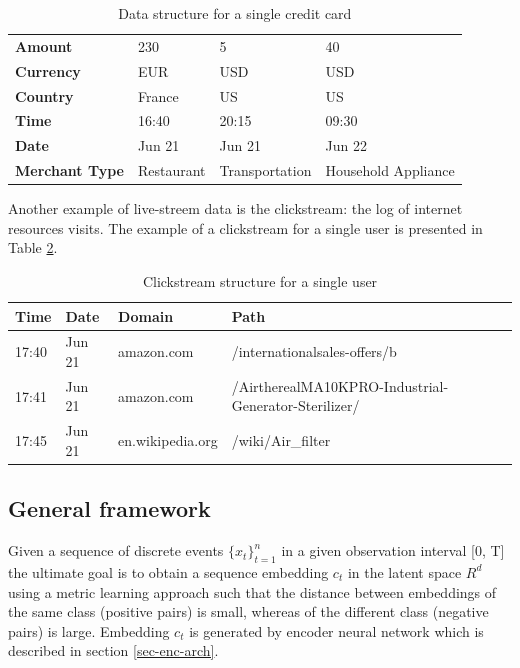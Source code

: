 \documentclass[sigconf]{acmart}
\begin{document}
\begin{table}[ht]
\caption{Data structure for a single credit card}
\begin{tabular}{ | m{7em} |  m{5em} m{5em} m{5em}| }
\hline
\textbf{Amount} & 230 & 5 & 40 \\
\textbf{Currency} & EUR & USD & USD \\
\textbf{Country} & France & US & US \\
\textbf{Time} & 16:40 & 20:15 & 09:30 \\
\textbf{Date} & Jun 21 & Jun 21 & Jun 22 \\
\textbf{Merchant Type} & Restaurant & Transport\-ation & Household Appliance \\
\hline
\end{tabular}
\label{tab-tr-data}
\end{table}

Another example of live-streem data is the clickstream: the log of internet resources visits. The example of a clickstream for a single user is presented in Table \ref{tab-cs-data}.

\begin{table}[ht]
\caption{Clickstream structure for a single user}
\begin{tabular}{ | m{2em} m{3em} m{6em} m{10em}| }
\hline
\textbf{Time} & \textbf{Date} & \textbf{Domain} & \textbf{Path} \\
\hline
17:40 & Jun 21 & amazon.com & /international\-sales-offers/b \\
17:41 & Jun 21 & amazon.com & /Airthereal\-MA10K\-PRO-Industrial-Generator-Sterilizer/ \\
17:45 & Jun 21 & en.wikipedia.org & /wiki\-/Air\_filter \\
\hline
\end{tabular}
\label{tab-cs-data}
\end{table}

\subsection{General framework}

Given a sequence of discrete events $\{x_t \}^n_{t=1}$ in a given observation interval [0, T] the ultimate goal is to obtain a sequence embedding $c_t$ in the latent space $R^d$ using a metric learning approach such that the distance between embeddings of the same class (positive pairs) is small, whereas of the different class (negative pairs) is large. Embedding $c_t$ is generated by encoder neural network which is described in section \ref{sec-enc-arch}.
\end{document}
